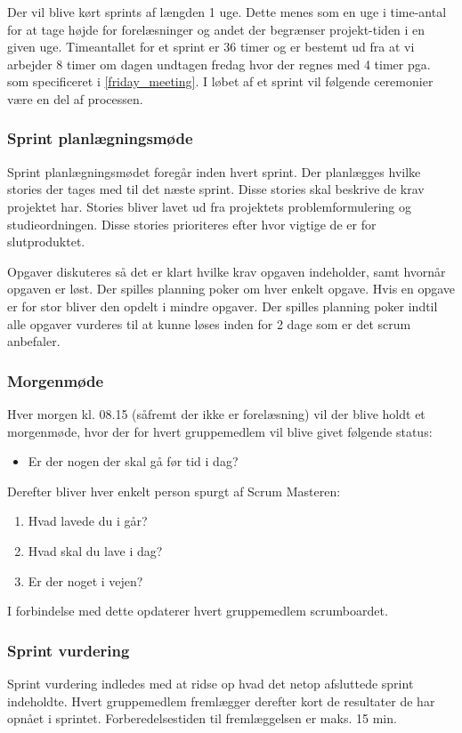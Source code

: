 {Der vil blive kørt sprints af længden 1 uge.
Dette menes som en uge i time-antal for at tage højde for forelæsninger og andet der begrænser projekt-tiden i en given uge.
Timeantallet for et sprint er 36 timer og er bestemt ud fra at vi arbejder 8 timer om dagen undtagen fredag hvor der regnes med 4 timer pga.  som specificeret i \cref{friday_meeting}.
I løbet af et sprint vil følgende ceremonier være en del af processen.
\\
\subsubsection{Sprint planlægningsmøde}
Sprint planlægningsmødet foregår inden hvert sprint. 
Der planlægges hvilke stories der tages med til det næste sprint. 
Disse stories skal beskrive de krav projektet har.
Stories bliver lavet ud fra projektets problemformulering og studieordningen.
Disse stories prioriteres efter hvor vigtige de er for slutproduktet.

Opgaver diskuteres så det er klart hvilke krav opgaven indeholder, samt hvornår opgaven er løst.
Der spilles planning poker om hver enkelt opgave.
Hvis en opgave er for stor bliver den opdelt i mindre opgaver.
Der spilles planning poker indtil alle opgaver vurderes til at kunne løses inden for 2 dage som er det scrum\cite{larman} anbefaler.

\subsubsection{Morgenmøde}
Hver morgen kl. 08.15 (såfremt der ikke er forelæsning) vil der blive holdt et morgenmøde, hvor der for hvert gruppemedlem vil blive givet følgende status:
\begin{itemize}
\item{Er der nogen der skal gå før tid i dag?}
\end{itemize}
Derefter bliver hver enkelt person spurgt af Scrum Masteren:
\begin{enumerate}
\item{Hvad lavede du i går?}
\item{Hvad skal du lave i dag?}
\item{Er der noget i vejen?}
\end{enumerate}
I forbindelse med dette opdaterer hvert gruppemedlem scrumboardet.

\subsubsection{Sprint vurdering}
Sprint vurdering indledes med at ridse op hvad det netop afsluttede sprint indeholdte. 
Hvert gruppemedlem fremlægger derefter kort de resultater de har opnået i sprintet.
Forberedelsestiden til fremlæggelsen er maks. 15 min.

}
